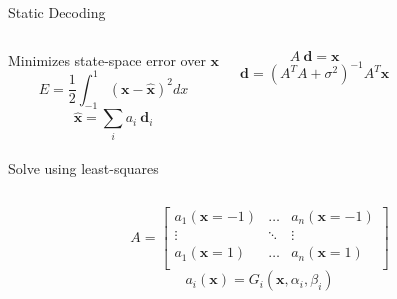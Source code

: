 \documentclass[aspectratio=169]{beamer}
\begin{document}
\begin{frame}{Static Decoding}
\begin{columns}
	\centering
	Minimizes state-space error over $\mathbf{x}$
	\begin{equation*}
	    E = \frac{1}{2}\int_{-1}^1 (\mathbf{x} - \hat{\mathbf{x}})^2 dx
	\end{equation*}
	\begin{equation*}
	    \hat{\mathbf{x}} = \sum_i a_i ~\mathbf{d}_i
	\end{equation*} \\
	Solve using least-squares \\
	\vspace{0.25cm}
	\begin{minipage}{0.5\textwidth}
	\begin{equation*}
	    A ~\mathbf{d} = \mathbf{x}
	\end{equation*}
	\begin{equation*}
	    \mathbf{d} = (A^T A + \sigma^2)^{-1} A^T \mathbf{x}
	\end{equation*}
	\end{minipage}
\end{columns}
\pause
{}
\begin{equation*}
    A = \begin{bmatrix}
    a_{1}(\mathbf{x}=-1) & \dots & a_{n}(\mathbf{x}=-1) \\
    \vdots & \ddots & \vdots \\
    a_{1}(\mathbf{x}=1) & \dots & a_{n}(\mathbf{x}=1) \\
    \end{bmatrix}
\end{equation*}
\begin{equation*}
    a_i(\mathbf{x}) = G_i(\mathbf{x}, \alpha_i, \beta_i)
\end{equation*}
\end{frame}
\end{document}

